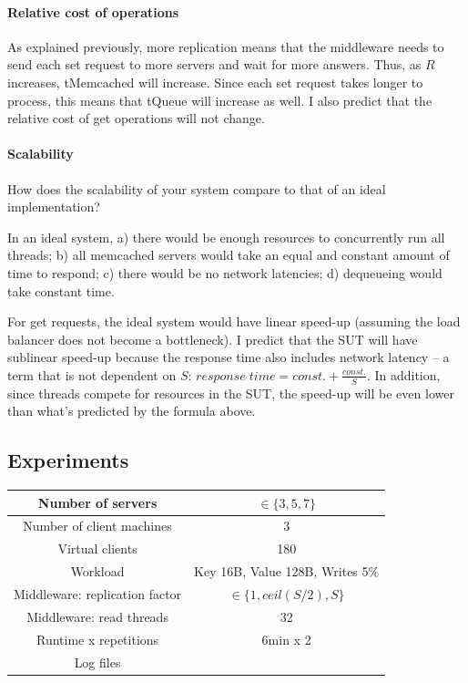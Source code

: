 \documentclass[11pt]{article}
\newcommand{\todo}[1]{\fcolorbox{black}{Apricot}{TODO: #1}}
\begin{document}
\paragraph{Relative cost of operations}
As explained previously, more replication means that the middleware needs to send each set request to more servers and wait for more answers. Thus, as $R$ increases, tMemcached will increase. Since each set request takes longer to process, this means that tQueue will increase as well. I also predict that the relative cost of get operations will not change.


\paragraph{Scalability}
How does the scalability of your system compare to that of an ideal implementation? 

In an ideal system, a) there would be enough resources to concurrently run all threads; b) all memcached servers would take an equal and constant amount of time to respond; c) there would be no network latencies; d) dequeueing would take constant time.

For get requests, the ideal system would have linear speed-up (assuming the load balancer does not become a bottleneck). I predict that the SUT will have sublinear speed-up because the response time also includes network latency -- a term that is not dependent on $S$: $response \; time = const. + \frac{const.}{S}$. In addition, since threads compete for resources in the SUT, the speed-up will be even lower than what's predicted by the formula above.

\subsection{Experiments}
\begin{center}
\small{
\smallskip
\begin{tabular}{|c|c|}
\hline Number of servers & $\in \{3, 5, 7\}$ \\ 
\hline Number of client machines & 3 \\ 
\hline Virtual clients & 180 \\ 
\hline Workload & Key 16B, Value 128B, Writes 5\% \\
\hline Middleware: replication factor & $\in \{1, ceil(S/2), S\}$ \\ 
\hline Middleware: read threads & 32 \\ 
\hline Runtime x repetitions & 6min x 2 \\ 
\hline Log files & \todo{} \\
\hline 
\end{tabular} }
\end{center}
\end{document}
